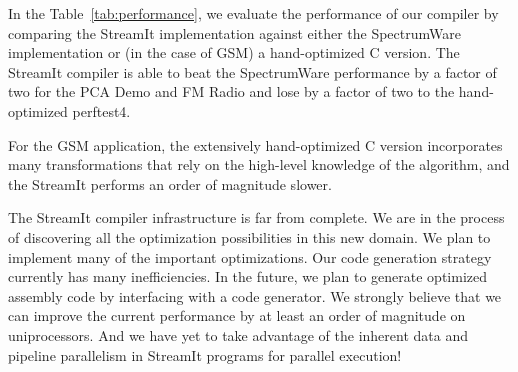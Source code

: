 



In the Table~\ref{tab:performance}, we evaluate the performance of our
compiler by comparing the StreamIt implementation against either the
SpectrumWare implementation or (in the case of GSM) a hand-optimized C
version.  The StreamIt compiler is able to beat the SpectrumWare
performance by a factor of two for the PCA Demo and FM Radio and lose
by a factor of two to the hand-optimized perftest4.

For the GSM application, the extensively hand-optimized C version
incorporates many transformations that rely on the high-level
knowledge of the algorithm, and the StreamIt performs an order of
magnitude slower.

The StreamIt compiler infrastructure is far from complete. We are in
the process of discovering all the optimization possibilities in this
new domain.  We plan to implement many of the important optimizations.
Our code generation strategy currently has many inefficiencies. In the
future, we plan to generate optimized assembly code by interfacing
with a code generator.  We strongly believe that we can improve the
current performance by at least an order of magnitude on
uniprocessors. And we have yet to take advantage of the inherent data
and pipeline parallelism in StreamIt programs for parallel execution!

